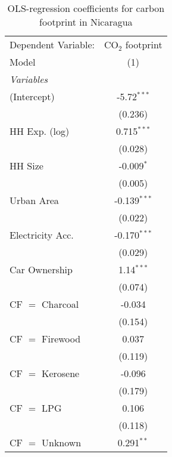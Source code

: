 
\begin{table}[htbp!]
   \centering
   \small
   \begin{adjustbox}{width = 1\textwidth, max height = 0.95\textheight, center}
      \begin{threeparttable}[b]
         \caption{\label{tab:OLS_2_NIC} OLS-regression coefficients for carbon footprint in Nicaragua}
         \begin{tabular}{lc}
            \tabularnewline \midrule \midrule
            Dependent Variable: & CO$_{2}$ footprint\\  
            Model               & (1)\\  
            \midrule
            \emph{Variables}\\
            (Intercept)         & -5.72$^{***}$\\   
                                & (0.236)\\   
            HH Exp. (log)       & 0.715$^{***}$\\   
                                & (0.028)\\   
            HH Size             & -0.009$^{*}$\\   
                                & (0.005)\\   
            Urban Area          & -0.139$^{***}$\\   
                                & (0.022)\\   
            Electricity Acc.    & -0.170$^{***}$\\   
                                & (0.029)\\   
            Car Ownership       & 1.14$^{***}$\\   
                                & (0.074)\\   
            CF $=$ Charcoal     & -0.034\\   
                                & (0.154)\\   
            CF $=$ Firewood     & 0.037\\   
                                & (0.119)\\   
            CF $=$ Kerosene     & -0.096\\   
                                & (0.179)\\   
            CF $=$ LPG          & 0.106\\   
                                & (0.118)\\   
            CF $=$ Unknown      & 0.291$^{**}$\\   

\end{tabular}
\end{threeparttable}
\end{adjustbox}
\end{table}
